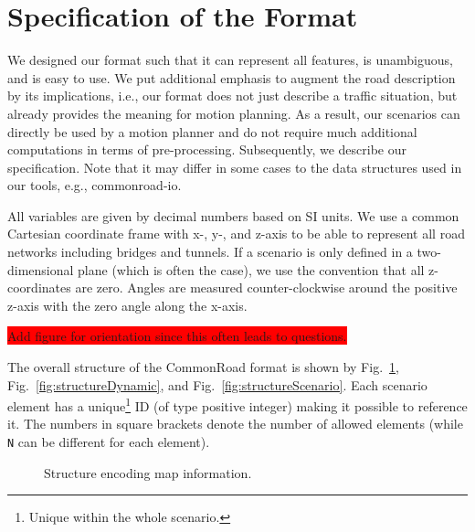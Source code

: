 

\section{Specification of the Format}

We designed our format such that it can represent all features, is unambiguous, and is easy to use. 
We put additional emphasis to augment the road description by its implications, i.e., our format does not just describe a traffic situation, but already provides the meaning for motion planning.
As a result, our scenarios can directly be used by a motion planner and do not require much additional computations in terms of pre-processing.
Subsequently, we describe our specification.
Note that it may differ in some cases to the data structures used in our tools, e.g., commonroad-io.

All variables are given by decimal numbers based on SI units. We use a common Cartesian coordinate frame with x-, y-, and z-axis to be able to represent all road networks including bridges and tunnels. 
If a scenario is only defined in a two-dimensional plane (which is often the case), we use the convention that all z-coordinates are zero.
Angles are measured counter-clockwise around the positive z-axis with the zero angle along the x-axis.

\colorbox{red}{Add figure for orientation since this often leads to questions.}

The overall structure of the CommonRoad format is shown by Fig.~\ref{fig:structureMap}, Fig.~\ref{fig:structureDynamic}, and Fig.~\ref{fig:structureScenario}. 
Each scenario element has a unique\footnote{Unique within the whole scenario.} ID (of type positive integer) making it possible to reference it.
The numbers in square brackets denote the number of allowed elements (while \texttt{N} can be different for each element).


\begin{figure}[!htpb]
	\small
	\caption{Structure encoding map information.}
	\label{fig:structureMap}
\end{figure}

